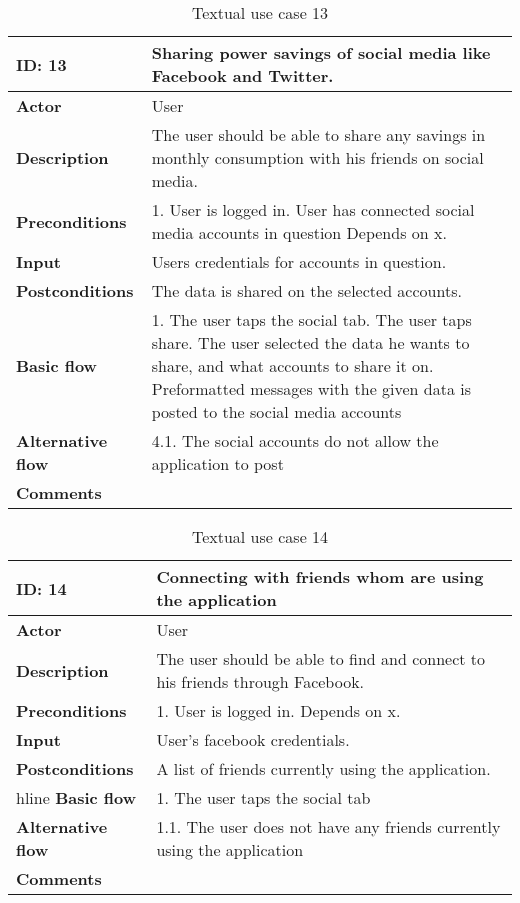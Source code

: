 \begin{table}[H]
\begin{tabular}{|l|p{11.7cm}|}
\hline
\textbf{ID: }13&\textbf{Sharing power savings of social media like Facebook and Twitter.}
\\\hline
\textbf{Actor} &User
\\\hline
\textbf{Description}&
The user should be able to share any savings in monthly consumption with his friends on social media.\\\hline
\textbf{Preconditions}&
1. User is logged in\newline
2. User has connected social media accounts in question\newline
Depends on x.\\\hline
\textbf{Input}&
Users credentials for accounts in question.\\\hline
\textbf{Postconditions}& 
The data is shared on the selected accounts. \\\hline
\textbf{Basic flow}&
1. The user taps the social tab\newline
2. The user taps share\newline
3. The user selected the data he wants to share, and what accounts to share it on\newline
4. Preformatted messages with the given data is posted to the social media accounts
\\\hline
\textbf{Alternative flow}&
4.1. The social accounts do not allow the application to post
\\\hline
\textbf{Comments}& \\\hline
\end{tabular}
\caption{Textual use case 13}
\end{table}

\begin{table}[H]
\begin{tabular}{|l|p{11.7cm}|}
\hline
\textbf{ID: }14&\textbf{Connecting with friends whom are using the application}
\\\hline
\textbf{Actor} &User
\\\hline
\textbf{Description}&
The user should be able to find and connect to his friends through Facebook.\\\hline
\textbf{Preconditions}&
1. User is logged in.\newline
Depends on x.\\\hline
\textbf{Input}&
User's facebook credentials.\\\hline
\textbf{Postconditions}& 
A list of friends currently using the application.\\hline
\textbf{Basic flow}&
1. The user taps the social tab
\\\hline
\textbf{Alternative flow}&
1.1. The user does not have any friends currently using the application
\\\hline
\textbf{Comments}& \\\hline
\end{tabular}
\caption{Textual use case 14}
\end{table}


